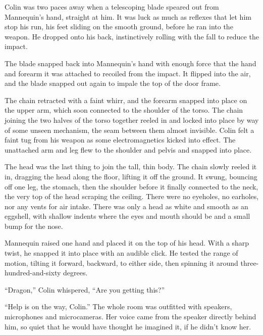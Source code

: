 Colin was two paces away when a telescoping blade speared out from Mannequin's hand, straight at him.  It was luck as much as reflexes that let him stop his run, his feet sliding on the smooth ground, before he ran into the weapon.  He dropped onto his back, instinctively rolling with the fall to reduce the impact.



The blade snapped back into Mannequin's hand with enough force that the hand and forearm it was attached to recoiled from the impact.  It flipped into the air, and the blade snapped out again to impale the top of the door frame.



The chain retracted with a faint whirr, and the forearm snapped into place on the upper arm, which soon connected to the shoulder of the torso.  The chain joining the two halves of the torso together reeled in and locked into place by way of some unseen mechanism, the seam between them almost invisible.  Colin felt a faint tug from his weapon as some electromagnetics kicked into effect.  The unattached arm and leg flew to the shoulder and pelvis and snapped into place.



The head was the last thing to join the tall, thin body.  The chain slowly reeled it in, dragging the head along the floor, lifting it off the ground.  It swung, bouncing off one leg, the stomach, then the shoulder before it finally connected to the neck, the very top of the head scraping the ceiling.  There were no eyeholes, no earholes, nor any vents for air intake.  There was only a head as white and smooth as an eggshell, with shallow indents where the eyes and mouth should be and a small bump for the nose.



Mannequin raised one hand and placed it on the top of his head.  With a sharp twist, he snapped it into place with an audible click.  He tested the range of motion, tilting it forward, backward, to either side, then spinning it around three-hundred-and-sixty degrees.



``Dragon,'' Colin whispered, ``Are you getting this?''



``Help is on the way, Colin.''  The whole room was outfitted with speakers, microphones and microcameras.  Her voice came from the speaker directly behind him, so quiet that he would have thought he imagined it, if he didn't know her.



